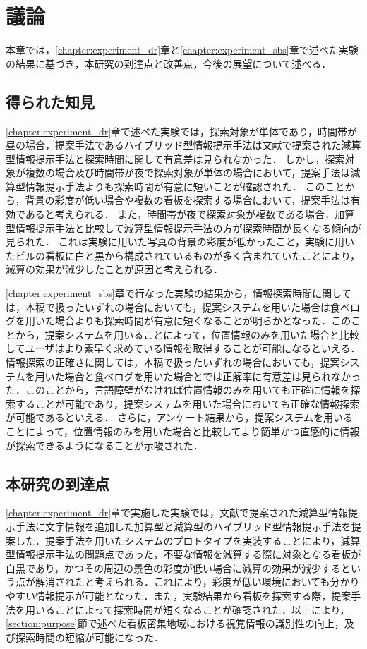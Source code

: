 \chapter{議論}
\label{chapter:discussion}
本章では，\ref{chapter:experiment_dr}章と\ref{chapter:experiment_sbs}章で述べた実験の結果に基づき，本研究の到達点と改善点，今後の展望について述べる．

\section{得られた知見}
\label{section:obtained_knowledge}
  \ref{chapter:experiment_dr}章で述べた実験では，探索対象が単体であり，時間帯が昼の場合，提案手法であるハイブリッド型情報提示手法は文献\cite{Fujita:2013}で提案された減算型情報提示手法と探索時間に関して有意差は見られなかった．
  しかし，探索対象が複数の場合及び時間帯が夜で探索対象が単体の場合において，提案手法は減算型情報提示手法よりも探索時間が有意に短いことが確認された．
  このことから，背景の彩度が低い場合や複数の看板を探索する場合において，提案手法は有効であると考えられる．
  また，時間帯が夜で探索対象が複数である場合，加算型情報提示手法と比較して減算型情報提示手法の方が探索時間が長くなる傾向が見られた．
  これは実験に用いた写真の背景の彩度が低かったこと，実験に用いたビルの看板に白と黒から構成されているものが多く含まれていたことにより，減算の効果が減少したことが原因と考えられる．

  \ref{chapter:experiment_sbs}章で行なった実験の結果から，情報探索時間に関しては，本稿で扱ったいずれの場合においても，提案システムを用いた場合は食べログを用いた場合よりも探索時間が有意に短くなることが明らかとなった．このことから，提案システムを用いることによって，位置情報のみを用いた場合と比較してユーザはより素早く求めている情報を取得することが可能になるといえる．
  情報探索の正確さに関しては，本稿で扱ったいずれの場合においても，提案システムを用いた場合と食べログを用いた場合とでは正解率に有意差は見られなかった．このことから，言語障壁がなければ位置情報のみを用いても正確に情報を探索することが可能であり，提案システムを用いた場合においても正確な情報探索が可能であるといえる．
  さらに，アンケート結果から，提案システムを用いることによって，位置情報のみを用いた場合と比較してより簡単かつ直感的に情報が探索できるようになることが示唆された．

\section{本研究の到達点}
  \ref{chapter:experiment_dr}章で実施した実験では，文献\cite{Fujita:2013}で提案された減算型情報提示手法に文字情報を追加した加算型と減算型のハイブリッド型情報提示手法を提案した．提案手法を用いたシステムのプロトタイプを実装することにより，減算型情報提示手法の問題点であった，不要な情報を減算する際に対象となる看板が白黒であり，かつその周辺の景色の彩度が低い場合に減算の効果が減少するという点が解消されたと考えられる．これにより，彩度が低い環境においても分かりやすい情報提示が可能となった．また，実験結果から看板を探索する際，提案手法を用いることによって探索時間が短くなることが確認された．以上により，\ref{section:purpose}節で述べた看板密集地域における視覚情報の識別性の向上，及び探索時間の短縮が可能になった．

